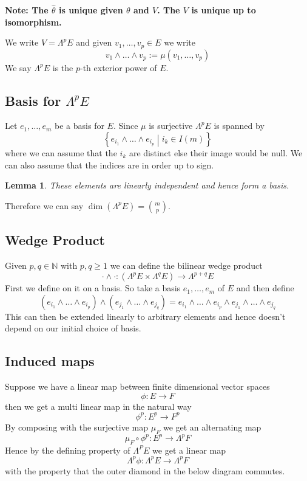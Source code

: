 \documentclass[11pt]{article}
\newcommand{\defeq}{:=}
\newcommand{\relmiddle}[1]{\mathrel{}\middle#1\mathrel{}}
\newcommand{\rmv}{\relmiddle|}
\newcommand{\N}{\mathbb{N}}
\newenvironment{defin}
	{\begin{mdframed}[backgroundcolor=white, roundcorner=5pt, linewidth=1pt, linecolor=RoyalBlue]
		\setlength{\parindent}{0pt}}
	{\end{mdframed}}
\newcommand{\mdf}[1]{{\color{RoyalBlue} #1}}
\newenvironment{note}
	{\begin{mdframed}[backgroundcolor=white, linecolor=RubineRed, roundcorner=5pt, linewidth=1pt]\bfseries{Note:}\normalfont
	\setlength{\parindent}{0pt}}
	{\end{mdframed}}
\newtheorem{lemma}[theorem]{Lemma}
\begin{document}
\begin{note}
	The $\hat{\theta}$ is unique given $\theta$ and $V$.
	The $V$ is unique up to isomorphism.
\end{note}

\begin{defin}
We write $V = \Lambda^p E$ and given $v_1, \dots , v_p\in E$ we write
\[
	v_1 \wedge \dots \wedge v_p \defeq \mu(v_1, \dots ,v_p)
\]
We say $\Lambda^p E$ is the \mdf{$p$-th exterior power of $E$}.
\end{defin}

\subsection{Basis for $\Lambda^p E$}
Let $e_1, \dots , e_m$ be a basis for $E$.
Since $\mu$ is surjective $\Lambda^p E$ is spanned by
\[
	\left\{ e_{i_1} \wedge \dots \wedge e_{i_p} \rmv i_k\in I(m) \right\}
\]
where we can assume that the $i_k$ are distinct else their image would be null.
We can also assume that the indices are in order up to sign.

\begin{lemma}
These elements are linearly independent and hence form a basis.
\end{lemma}

Therefore we can say $\dim(\Lambda^p E) = \binom{m}{p}$.

\subsection{Wedge Product}
Given $p, q\in\N$ with $p, q \geq 1$ we can define the bilinear wedge product
\[
	\cdot \wedge \cdot : (\Lambda^p E \times \Lambda^q E) \to \Lambda^{p+q}E
\]
First we define on it on a basis.
So take a basis $e_1, \dots , e_m$ of $E$ and then define
\[
	(e_{i_1} \wedge \dots \wedge e_{i_p}) \wedge (e_{j_1} \wedge \dots \wedge e_{j_q}) = e_{i_1} \wedge \dots \wedge e_{i_p} \wedge e_{j_1} \wedge \dots \wedge e_{j_q}
\]
This can then be extended linearly to arbitrary elements and hence doesn't depend on our initial choice of basis.

\subsection{Induced maps}
Suppose we have a linear map between finite dimensional vector spaces
\[
\phi : E \to F
\]
then we get a multi linear map in the natural way
\[
\phi^p : E^p \to F^p
\]
By composing with the surjective map $\mu_F$ we get an alternating map
\[
\mu_F \circ \phi^p : E^p \to \Lambda^p F
\]
Hence by the defining property of $\Lambda^P E$ we get a linear map
\[
\Lambda^p \phi : \Lambda^p E \to \Lambda^p F
\]
with the property that the outer diamond in the below diagram commutes.
\end{document}
